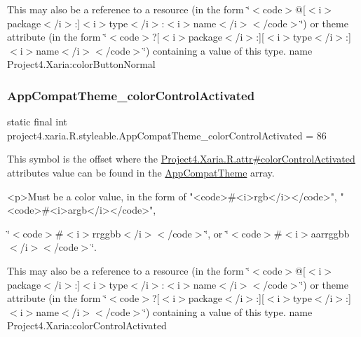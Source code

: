 This may also be a reference to a resource (in the form \char`\"{}$<$code$>$@\mbox{[}$<$i$>$package$<$/i$>$\+:\mbox{]}$<$i$>$type$<$/i$>$\+:$<$i$>$name$<$/i$>$$<$/code$>$\char`\"{}) or theme attribute (in the form \char`\"{}$<$code$>$?\mbox{[}$<$i$>$package$<$/i$>$\+:\mbox{]}\mbox{[}$<$i$>$type$<$/i$>$\+:\mbox{]}$<$i$>$name$<$/i$>$$<$/code$>$\char`\"{}) containing a value of this type.  name Project4.\+Xaria\+:color\+Button\+Normal \mbox{\label{classproject4_1_1xaria_1_1R_1_1styleable_ade53ff10ccbf446032b640b82cfcd1d8}} 
\subsubsection{\texorpdfstring{App\+Compat\+Theme\+\_\+color\+Control\+Activated}{AppCompatTheme\_colorControlActivated}}
{\footnotesize\ttfamily static final int project4.\+xaria.\+R.\+styleable.\+App\+Compat\+Theme\+\_\+color\+Control\+Activated = 86\hspace{0.3cm}{\ttfamily [static]}}

This symbol is the offset where the \hyperlink{}{Project4.\+Xaria.\+R.\+attr\#color\+Control\+Activated} attribute\textquotesingle{}s value can be found in the \hyperlink{classproject4_1_1xaria_1_1R_1_1styleable_aad8bec413e2350f9404e6ff0e831a85d}{App\+Compat\+Theme} array.

\begin{DoxyVerb}      <p>Must be a color value, in the form of "<code>#<i>rgb</i></code>", "<code>#<i>argb</i></code>",
\end{DoxyVerb}
 \char`\"{}$<$code$>$\#$<$i$>$rrggbb$<$/i$>$$<$/code$>$\char`\"{}, or \char`\"{}$<$code$>$\#$<$i$>$aarrggbb$<$/i$>$$<$/code$>$\char`\"{}. 

This may also be a reference to a resource (in the form \char`\"{}$<$code$>$@\mbox{[}$<$i$>$package$<$/i$>$\+:\mbox{]}$<$i$>$type$<$/i$>$\+:$<$i$>$name$<$/i$>$$<$/code$>$\char`\"{}) or theme attribute (in the form \char`\"{}$<$code$>$?\mbox{[}$<$i$>$package$<$/i$>$\+:\mbox{]}\mbox{[}$<$i$>$type$<$/i$>$\+:\mbox{]}$<$i$>$name$<$/i$>$$<$/code$>$\char`\"{}) containing a value of this type.  name Project4.\+Xaria\+:color\+Control\+Activated \mbox{\label{classproject4_1_1xaria_1_1R_1_1styleable_a9951a735820466ee03e784ca50e2c4f4}} 
